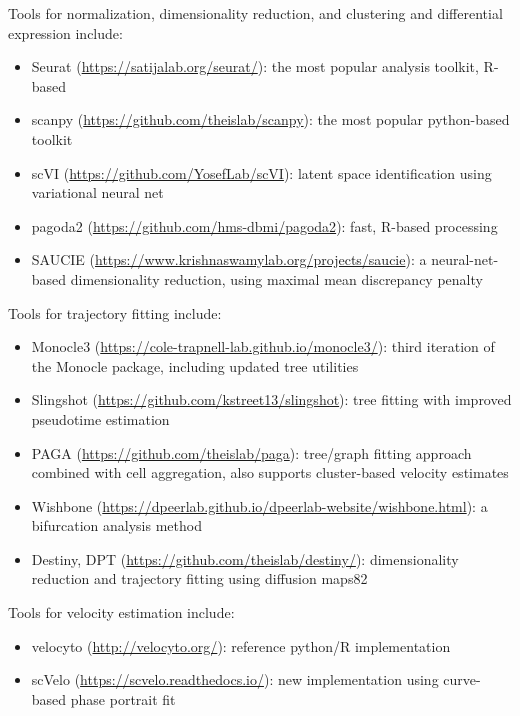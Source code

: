 \documentclass[
]{book}
\begin{document}
Tools for normalization, dimensionality reduction, and clustering and differential expression include:

\begin{itemize}
\item
  Seurat (\url{https://satijalab.org/seurat/}): the most popular analysis toolkit, R-based
\item
  scanpy (\url{https://github.com/theislab/scanpy}): the most popular python-based toolkit
\item
  scVI (\url{https://github.com/YosefLab/scVI}): latent space identification using variational neural net
\item
  pagoda2 (\url{https://github.com/hms-dbmi/pagoda2}): fast, R-based processing
\item
  SAUCIE (\url{https://www.krishnaswamylab.org/projects/saucie}): a neural-net-based dimensionality reduction, using maximal mean discrepancy penalty
\end{itemize}

Tools for trajectory fitting include:

\begin{itemize}
\item
  Monocle3 (\url{https://cole-trapnell-lab.github.io/monocle3/}): third iteration of the Monocle package, including updated tree utilities
\item
  Slingshot (\url{https://github.com/kstreet13/slingshot}): tree fitting with improved pseudotime estimation
\item
  PAGA (\url{https://github.com/theislab/paga}): tree/graph fitting approach combined with cell aggregation, also supports cluster-based velocity estimates
\item
  Wishbone (\url{https://dpeerlab.github.io/dpeerlab-website/wishbone.html}): a bifurcation analysis method
\item
  Destiny, DPT (\url{https://github.com/theislab/destiny/}): dimensionality reduction and trajectory fitting using diffusion maps82
\end{itemize}

Tools for velocity estimation include:

\begin{itemize}
\item
  velocyto (\url{http://velocyto.org/}): reference python/R implementation
\item
  scVelo (\url{https://scvelo.readthedocs.io/}): new implementation using curve-based phase portrait fit
\end{itemize}
\end{document}
